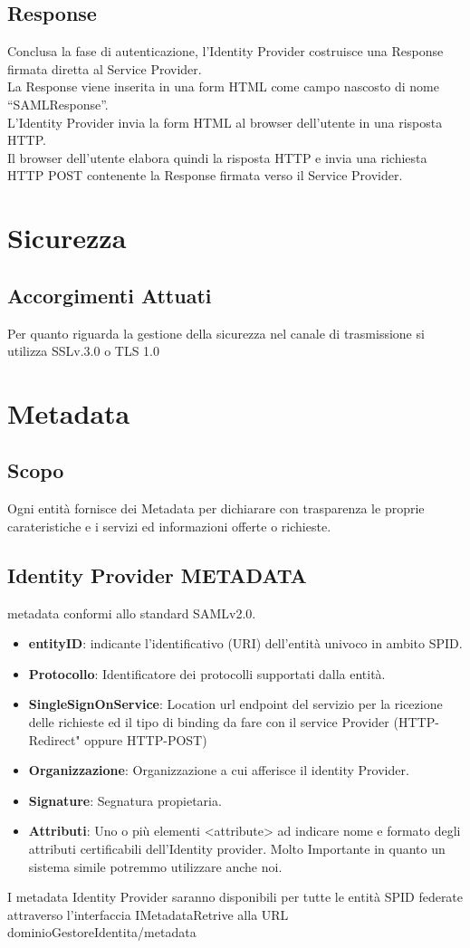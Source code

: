 \subsection{Response}
Conclusa la fase di autenticazione, l’Identity Provider costruisce una Response firmata diretta
al Service Provider.
\\ La Response viene inserita in una form HTML come campo nascosto di nome
“SAMLResponse”. 
\\ L’Identity Provider invia la form HTML al browser dell’utente in una risposta
HTTP.
\\ Il browser dell’utente elabora quindi la risposta HTTP e invia una richiesta HTTP POST
contenente la Response firmata verso il Service Provider.

\section{Sicurezza}
\subsection{Accorgimenti Attuati}
Per quanto riguarda la gestione della sicurezza nel canale di trasmissione
si utilizza SSLv.3.0 o TLS 1.0


\section{Metadata}
\subsection{Scopo}
Ogni entità fornisce dei Metadata per dichiarare con trasparenza le proprie carateristiche e i servizi ed informazioni offerte o richieste.
\subsection{Identity Provider METADATA}
metadata conformi allo standard SAMLv2.0.
\begin{itemize}
    \item \textbf{entityID}: indicante l’identificativo (URI) dell’entità univoco in ambito SPID.
    \item \textbf{Protocollo}: Identificatore dei protocolli supportati dalla entità.
    \item \textbf{SingleSignOnService}: Location url endpoint del servizio per la ricezione delle richieste ed il tipo di binding da fare con il service Provider (HTTP-Redirect" oppure HTTP-POST)
    \item \textbf{Organizzazione}: Organizzazione a cui afferisce il identity Provider.
    \item \textbf{Signature}: Segnatura propietaria.
    \item \textbf{Attributi}: Uno o più elementi <attribute> ad indicare nome e formato degli attributi certificabili dell’Identity provider.
    Molto Importante in quanto un sistema simile potremmo utilizzare anche noi.
\end{itemize}
I metadata Identity Provider saranno disponibili per tutte le entità SPID federate attraverso
l’interfaccia IMetadataRetrive alla URL dominioGestoreIdentita/metadata

